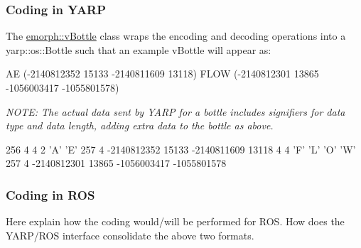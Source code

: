 \subsubsection*{Coding in Y\-A\-R\-P }

The \hyperlink{classemorph_1_1vBottle}{emorph\-::v\-Bottle} class wraps the encoding and decoding operations into a yarp\-::os\-::\-Bottle such that an example v\-Bottle will appear as\-: \begin{DoxyVerb}AE (-2140812352 15133 -2140811609 13118) FLOW (-2140812301 13865 -1056003417 -1055801578)
\end{DoxyVerb}


{\itshape N\-O\-T\-E\-: The actual data sent by Y\-A\-R\-P for a bottle includes signifiers for data type and data length, adding extra data to the bottle as above.} \begin{DoxyVerb}256 4 4 2 'A' 'E' 257 4 -2140812352 15133 -2140811609 13118 4 4 'F' 'L' 'O' 'W' 257 4 -2140812301 13865 -1056003417 -1055801578
\end{DoxyVerb}


\subsubsection*{Coding in R\-O\-S }

Here explain how the coding would/will be performed for R\-O\-S. How does the Y\-A\-R\-P/\-R\-O\-S interface consolidate the above two formats. 